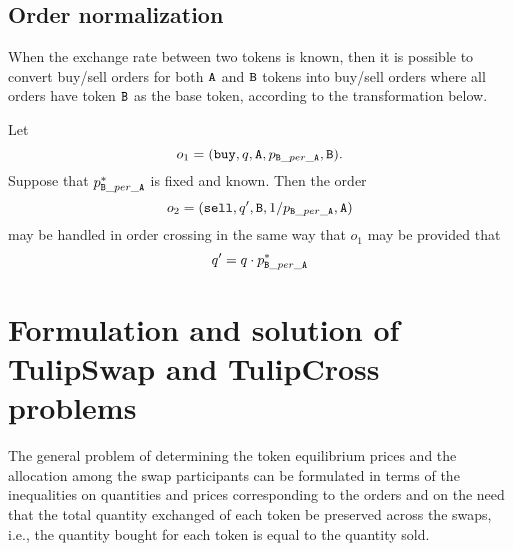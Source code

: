 \documentclass[11pt, reqno]{amsart}
\theoremstyle{definition}
\theoremstyle{remark}
\newcommand{\tA}{\textnormal{\texttt{A}}}
\newcommand{\tB}{\textnormal{\texttt{B}}}
\newcommand{\buy}{\textnormal{\texttt{buy}}}
\newcommand{\sell}{\textnormal{\texttt{sell}}}
\begin{document}
\subsection{Order normalization}
When the exchange rate between two tokens is known, then it is possible to
convert buy/sell orders for both $\tA$ and $\tB$ tokens into buy/sell orders
where all orders have token $\tB$ as the base token, according to the
transformation below.

Let
\[
    o_1 = (\buy, q, \tA, p_{\tB\_per\_\tA}, \tB).
\]
Suppose that $p^*_{\tB\_per\_\tA}$ is fixed and known. Then the order
\[
    o_2 = (\sell, q^\prime, \tB, 1 / p_{\tB\_per\_\tA}, \tA)
\]
may be handled in order crossing in the same way that $o_1$ may be
provided that
\[
    q^\prime = q \cdot p^*_{\tB\_per\_\tA}
\]

%
%
%

%
%


\section{Formulation and solution of TulipSwap and TulipCross problems}
The general problem of determining the token equilibrium prices and the
allocation among the swap participants can be formulated in terms of the
inequalities on quantities and prices corresponding to the orders and on the
need that the total quantity exchanged of each token be preserved across the
swaps, i.e., the quantity bought for each token is equal to the quantity sold.
\end{document}
